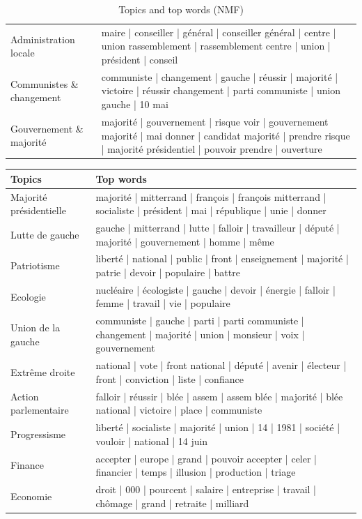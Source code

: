 \documentclass{article}
\begin{document}
\begin{table}[htbp]
\begin{tabular}{@{} l p{10cm} @{}}
Administration locale & maire | conseiller | général | conseiller général | centre | union rassemblement | rassemblement centre | union | président | conseil \\
Communistes \& changement & communiste | changement | gauche | réussir | majorité | victoire | réussir changement | parti communiste | union gauche | 10 mai \\
Gouvernement \& majorité & majorité | gouvernement | risque voir | gouvernement majorité | mai donner | candidat majorité | prendre risque | majorité présidentiel | pouvoir prendre | ouverture \\
\bottomrule
\end{tabular}
\caption{Topics and top words (NMF)}
\label{tab:nmf_topics}
\end{table}

\begin{table}[htbp]
\centering
\fontsize{8.5}{10}\selectfont
\begin{tabular}{@{} l p{10cm} @{}}
\toprule
Topics & Top words \\
\midrule
Majorité présidentielle & majorité | mitterrand | françois | françois mitterrand | socialiste | président | mai | république | unie | donner \\
Lutte de gauche & gauche | mitterrand | lutte | falloir | travailleur | député | majorité | gouvernement | homme | même \\
Patriotisme & liberté | national | public | front | enseignement | majorité | patrie | devoir | populaire | battre \\
Ecologie & nucléaire | écologiste | gauche | devoir | énergie | falloir | femme | travail | vie | populaire \\
Union de la gauche & communiste | gauche | parti | parti communiste | changement | majorité | union | monsieur | voix | gouvernement \\
Extrême droite & national | vote | front national | député | avenir | électeur | front | conviction | liste | confiance \\
Action parlementaire & falloir | réussir | blée | assem | assem blée | majorité | blée national | victoire | place | communiste \\
Progressisme & liberté | socialiste | majorité | union | 14 | 1981 | société | vouloir | national | 14 juin \\
Finance & accepter | europe | grand | pouvoir accepter | celer | financier | temps | illusion | production | triage \\
Economie & droit | 000 | pourcent | salaire | entreprise | travail | chômage | grand | retraite | milliard \\

\end{tabular}
\end{table}
\end{document}
